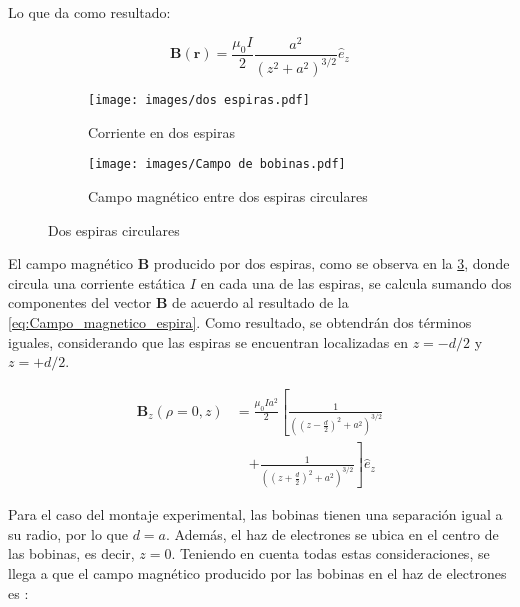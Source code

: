 Lo que da como resultado:

\begin{equation} 
    \mathbf{B}(\mathbf{r}) = \frac{\mu_{0}I}{2} \frac{a^{2}}{(z^{2}+a^{2})^{3/2}} \hat{e}_{z}
    \label{eq:Campo_magnetico_espira}
\end{equation} 

\begin{figure}[H]
    \centering
    \begin{subfigure}[a]{0.45\textwidth}
        \centering
        \texttt{[image: images/dos espiras.pdf]}
        \caption{Corriente en dos espiras}
        \label{fig:I_en_dos_espiras}
    \end{subfigure}
    \hfill
    \begin{subfigure}[b]{0.45\textwidth}
        \centering
        \texttt{[image: images/Campo de bobinas.pdf]}
        \caption{Campo magnético entre dos espiras circulares}
        \label{fig:CM_dos_espiras}
    \end{subfigure}
    \caption{Dos espiras circulares}
    \label{fig:dos_espiras}
\end{figure}

El campo magnético $\mathbf{B}$ producido por dos espiras, como se observa en la \cref{fig:dos_espiras}, donde circula una corriente estática $I$ en cada una de las espiras, se calcula sumando dos componentes del vector $\mathbf{B}$ de acuerdo al resultado de la \cref{eq:Campo_magnetico_espira}. Como resultado, se obtendrán dos términos iguales, considerando que las espiras se encuentran localizadas en $z = -d/2$ y $z = +d/2$.

\begin{equation}
\begin{aligned}
    \mathbf{B}_{z}(\rho=0,z) &= \frac{\mu_{0} I a^{2}}{2} \left[ \frac{1}{\left((z-\frac{d}{2})^{2} + a^{2}\right)^{3/2}} \right.\\
    &\quad \left.+ \frac{1}{\left((z+\frac{d}{2})^{2} + a^{2}\right)^{3/2}} \right] \hat{e}_{z}
    \label{Campo_magnetico_2espiras}
\end{aligned}
\end{equation}

Para el caso del montaje experimental, las bobinas tienen una separación igual a su radio, por lo que \( d = a \). Además, el haz de electrones se ubica en el centro de las bobinas, es decir, \( z = 0 \). Teniendo en cuenta todas estas consideraciones, se llega a que el campo magnético producido por las bobinas en el haz de electrones es \cite{boix_practica_2}:

